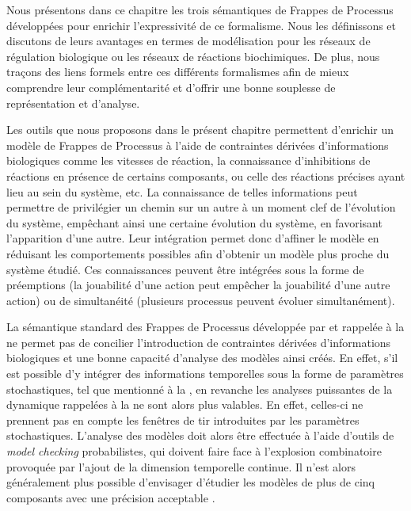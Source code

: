 Nous présentons dans ce chapitre les trois sémantiques de Frappes de Processus développées
pour enrichir l'expressivité de ce formalisme.
Nous les définissons et discutons de leurs avantages en termes de modélisation
pour les réseaux de régulation biologique ou les réseaux de réactions biochimiques.
De plus, nous traçons des liens formels entre ces différents formalismes
afin de mieux comprendre leur complémentarité
et d'offrir une bonne souplesse de représentation et d'analyse.

\myskip

Les outils que nous proposons dans le présent chapitre permettent
d'enrichir un modèle de Frappes de Processus à l'aide de
contraintes dérivées d'informations biologiques
comme les vitesses de réaction,
la connaissance d'inhibitions de réactions en présence de certains composants,
ou celle des réactions précises ayant lieu au sein du système, etc.
La connaissance de telles informations peut permettre de privilégier un chemin
sur un autre
à un moment clef de l'évolution du système, empêchant ainsi une certaine évolution du système,
en favorisant l'apparition d'une autre.
Leur intégration permet donc d'affiner le modèle en réduisant les comportements possibles
afin d'obtenir un modèle plus proche du système étudié.
Ces connaissances peuvent être intégrées sous la forme de préemptions (la jouabilité d'une action
peut empêcher la jouabilité d'une autre action) ou de simultanéité
(plusieurs processus peuvent évoluer simultanément).

La sémantique standard des Frappes de Processus
développée par 
et rappelée à la 
ne permet pas de concilier l'introduction de contraintes dérivées d'informations biologiques
et une bonne capacité d'analyse des modèles ainsi créés.
En effet, s'il est possible d'y intégrer des informations temporelles
sous la forme de paramètres stochastiques, tel que mentionné à la ,
en revanche les analyses puissantes de la dynamique rappelées à la 
ne sont alors plus valables.
En effet, celles-ci ne prennent pas en compte les fenêtres de tir introduites par les
paramètres stochastiques.
L'analyse des modèles doit alors être effectuée à l'aide d'outils de \textit{model checking}
probabilistes, qui doivent faire face à l'explosion combinatoire provoquée par l'ajout
de la dimension temporelle continue.
Il n'est alors généralement plus possible d'envisager d'étudier
les modèles de plus de cinq composants avec une précision acceptable
\cite[p.~170]{Pauleve11}.

